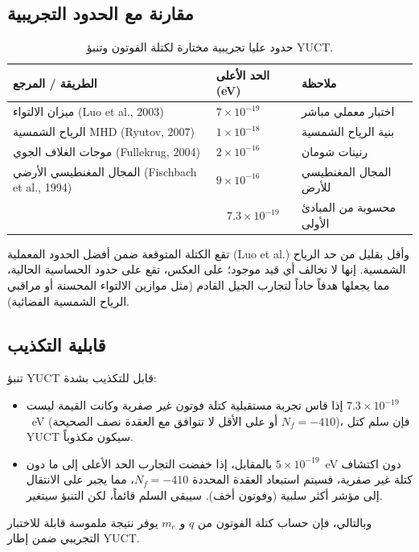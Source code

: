 \documentclass[12pt,a4paper]{article}
\begin{document}
	\subsection{مقارنة مع الحدود التجريبية}
	
	\begin{table}[H]
		\centering
		\footnotesize
		\caption{حدود عليا تجريبية مختارة لكتلة الفوتون وتنبؤ YUCT.}
		\label{tab:photon_limits}
		\begin{tabular}{p{5.2cm}p{2.2cm}p{3.6cm}}
			\toprule
			\textbf{الطريقة / المرجع} & \textbf{الحد الأعلى (eV)} & \textbf{ملاحظة} \\
			\midrule
			ميزان الالتواء (Luo et al., 2003) & \(7\times10^{-19}\) & اختبار معملي مباشر \\
			الرياح الشمسية MHD (Ryutov, 2007) & \(1\times10^{-18}\) & بنية الرياح الشمسية \\
			موجات الغلاف الجوي (Fullekrug, 2004) & \(2\times10^{-16}\) & رنينات شومان \\
			المجال المغنطيسي الأرضي (Fischbach et al., 1994) & \(9\times10^{-16}\) & المجال المغنطيسي للأرض \\
			\addlinespace
			\multicolumn{1}{c}{\textbf{تنبؤ YUCT}} & \multicolumn{1}{c}{\(7.3\times10^{-19}\)} & محسوبة من المبادئ الأولى \\
			\bottomrule
		\end{tabular}
	\end{table}
	
	تقع الكتلة المتوقعة ضمن أفضل الحدود المعملية (Luo et al.) وأقل بقليل من حد الرياح الشمسية. إنها لا تخالف أي قيد موجود؛ على العكس، تقع على حدود الحساسية الحالية، مما يجعلها هدفاً حاداً لتجارب الجيل القادم (مثل موازين الالتواء المحسنة أو مراقبي الرياح الشمسية الفضائية).
	
	\subsection{قابلية التكذيب}
	
	تنبؤ YUCT قابل للتكذيب بشدة:
	\begin{itemize}
		\item إذا قاس تجربة مستقبلية كتلة فوتون غير صفرية وكانت القيمة ليست \(7.3\times10^{-19}\)~eV (أو على الأقل لا تتوافق مع العقدة نصف الصحيحة \(N_f = -410\))، فإن سلم كتل YUCT سيكون مكذوباً.
		\item بالمقابل، إذا خفضت التجارب الحد الأعلى إلى ما دون \(5\times10^{-19}\)~eV دون اكتشاف كتلة غير صفرية، فسيتم استبعاد العقدة المحددة \(N_f = -410\)، مما يجبر على الانتقال إلى مؤشر أكثر سلبية (وفوتون أخف). سيبقى السلم قائماً، لكن التنبؤ سيتغير.
	\end{itemize}
	وبالتالي، فإن حساب كتلة الفوتون من \(q\) و \(m_e\) يوفر نتيجة ملموسة قابلة للاختبار التجريبي ضمن إطار YUCT.
	
\end{document}
